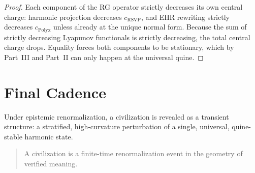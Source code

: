 \begin{proof}
Each component of the RG operator strictly decreases its own central charge:
harmonic projection decreases $c_{\mathrm{RSVP}}$, and EHR rewriting strictly decreases $c_{\mathrm{Polyx}}$ unless already at the unique normal form.
Because the sum of strictly decreasing Lyapunov functionals is strictly decreasing, the total central charge drops.  
Equality forces both components to be stationary, which by Part~III and Part~II can only happen at the universal quine.  
\end{proof}

\section{Final Cadence}

Under epistemic renormalization, a civilization is revealed as a transient
structure: a stratified, high-curvature perturbation of a single,
universal, quine-stable harmonic state.

\begin{quote}
A civilization is a finite-time renormalization event in the geometry  
of verified meaning.
\end{quote}


